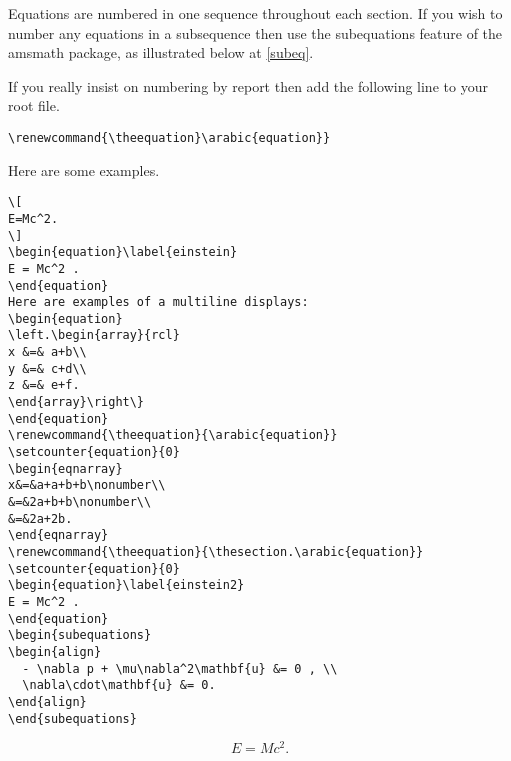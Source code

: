 \documentclass{MIIR}
\theoremstyle{plain}
\theoremstyle{definition}
\begin{document}
Equations are numbered in one sequence throughout each section. If you wish to number any equations in a subsequence then use the  subequations feature of the amsmath package, as illustrated below at \eqref{subeq}.

If you really insist on numbering by report then add the following line to your root file.
\begin{verbatim}
\renewcommand{\theequation}\arabic{equation}}
\end{verbatim}
Here are some examples.

\begin{verbatim}
\[
E=Mc^2.
\]
\begin{equation}\label{einstein}
E = Mc^2 .
\end{equation}
Here are examples of a multiline displays:
\begin{equation}
\left.\begin{array}{rcl}
x &=& a+b\\
y &=& c+d\\
z &=& e+f.
\end{array}\right\}
\end{equation}
\renewcommand{\theequation}{\arabic{equation}}
\setcounter{equation}{0}
\begin{eqnarray}
x&=&a+a+b+b\nonumber\\
&=&2a+b+b\nonumber\\
&=&2a+2b.
\end{eqnarray}
\renewcommand{\theequation}{\thesection.\arabic{equation}}
\setcounter{equation}{0}
\begin{equation}\label{einstein2}
E = Mc^2 .
\end{equation}
\begin{subequations}
\begin{align}
  - \nabla p + \mu\nabla^2\mathbf{u} &= 0 , \\
  \nabla\cdot\mathbf{u} &= 0. 
\end{align}
\end{subequations}
\end{verbatim}
\[
E=Mc^2.
\]
\end{document}
